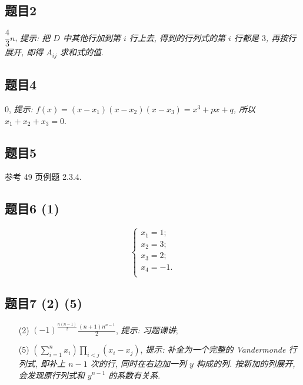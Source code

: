 \subsection*{题目2}
$\dfrac{4}{3}n$, \textit{提示: 把 $D$ 中其他行加到第 $i$ 行上去, 得到的行列式的第 $i$ 行都是 $3$, 再按行展开, 即得 $A_{ij}$ 求和式的值}.

\subsection*{题目4}
$0$, \textit{提示: $f(x) = (x - x_1)(x - x_2)(x - x_3) = x^3 + px + q$, 所以 $x_1 + x_2 + x_3 = 0$}.

\subsection*{题目5}
参考 49 页例题 2.3.4.

\subsection*{题目6 (1)}
\[
\begin{cases}
    x_1 = 1; \\
    x_2 = 3; \\
    x_3 = 2; \\
    x_4 = -1. \\
\end{cases}
\]

\subsection*{题目7 (2) (5)}
\begin{enumerate}
    \item[(2)] $\displaystyle (-1)^{\frac{n(n - 1)}{2}}\frac{(n + 1)n^{n - 1}}{2}$, \textit{提示: 习题课讲};
    \item[(5)] $\displaystyle \left(\sum_{i = 1}^{n} x_i\right) \prod_{i < j} (x_i - x_j)$, \textit{提示: 补全为一个完整的 Vandermonde 行列式, 即补上 $n-1$ 次的行, 同时在右边加一列 $y$ 构成的列. 按新加的列展开, 会发现原行列式和 $y^{n - 1}$ 的系数有关系}.
\end{enumerate}